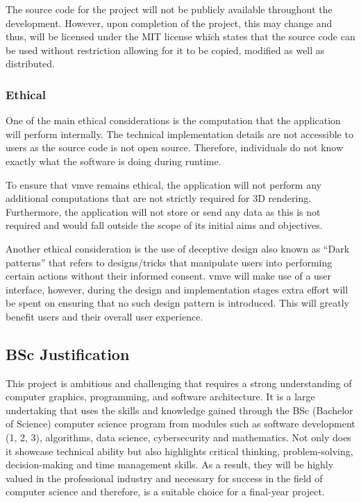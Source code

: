 \documentclass[11pt]{article}
\begin{document}
The source code for the project will not be publicly available throughout the
development. However, upon completion of the project, this may change and thus,
will be licensed under the MIT license \cite{mit} which states that the source
code can be used without restriction allowing for it to be copied, modified as
well as distributed.

\subsubsection{Ethical}
One of the main ethical considerations is the computation that the application
will perform internally. The technical implementation details are not accessible
to users as the source code is not open source. Therefore, individuals do not
know exactly what the software is doing during runtime.

To ensure that \gls*{vmve} remains ethical, the application will not perform any
additional computations that are not strictly required for 3D rendering.
Furthermore, the application will not store or send any data as this is not
required and would fall outside the scope of its initial aims and objectives.

Another ethical consideration is the use of deceptive design also known as
``Dark patterns'' that refers to designs/tricks that manipulate users into
performing certain actions without their informed consent. \gls*{vmve} will make
use of a user interface, however, during the design and implementation stages
extra effort will be spent on ensuring that no such design pattern is
introduced. This will greatly benefit users and their overall user experience.

\subsection{BSc Justification}
This project is ambitious and challenging that requires a strong understanding
of computer graphics, programming, and software architecture. It is a large
undertaking that uses the skills and knowledge gained through the BSc (Bachelor
of Science) computer science program from modules such as software development
(1, 2, 3), algorithms, data science, cybersecurity and mathematics. Not only
does it showcase technical ability but also highlights critical thinking,
problem-solving, decision-making and time management skills. As a result, they
will be highly valued in the professional industry and necessary for success in
the field of computer science and therefore, is a suitable choice for a
final-year project.
\end{document}
